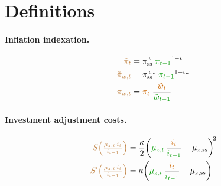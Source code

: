 \documentclass[11pt]{article}
\begin{document}
\section{Definitions}

\paragraph{Inflation indexation.}
\begin{align*}
  \textcolor{brown}{\tilde\pi_t}
    &= \pi_{\text{ss}}^{\,\iota}\;\textcolor{green!60!black}{\pi_{t-1}}^{1-\iota}
  \\
  \textcolor{brown}{\tilde\pi_{w,t}}
    &= \pi_{\text{ss}}^{\,\iota_w}\;\textcolor{green!60!black}{\pi_{t-1}}^{1-\iota_w}
  \\
  \textcolor{brown}{\pi_{w,t}}
    &= \textcolor{orange!80!black}{\pi_t}\;
       \frac{\textcolor{orange!80!black}{\tilde{w}_t}}{\textcolor{green!60!black}{\tilde{w}_{t-1}}}
\end{align*}

\paragraph{Investment adjustment costs.}
\begin{align*}
  \textcolor{brown}{S\!\left(\tfrac{\mu_{z,t}\,i_t}{i_{t-1}}\right)}
    &= \frac{\kappa}{2}\!\left(\textcolor{green!60!black}{\mu_{z,t}}\,
       \frac{\textcolor{orange!80!black}{i_t}}{\textcolor{green!60!black}{i_{t-1}}}
       - \mu_{z,\text{ss}}\right)^{\!2}
  \\
  \textcolor{brown}{S'\!\left(\tfrac{\mu_{z,t}\,i_t}{i_{t-1}}\right)}
    &= \kappa\!\left(\textcolor{green!60!black}{\mu_{z,t}}\,
       \frac{\textcolor{orange!80!black}{i_t}}{\textcolor{green!60!black}{i_{t-1}}}
       - \mu_{z,\text{ss}}\right)
\end{align*}
\end{document}
